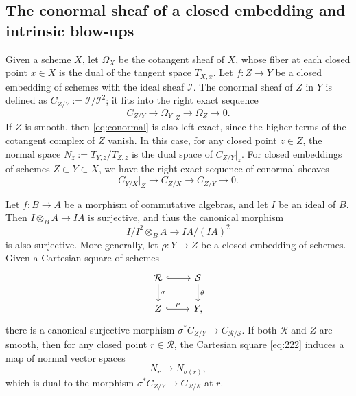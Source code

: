 \documentclass{amsart}
\numberwithin{equation}{section}
\newcommand\mc{\mathcal}
\theoremstyle{definition}
\theoremstyle{remark}
\begin{document}
\subsection{The conormal sheaf of a closed embedding and intrinsic blow-ups}
Given a scheme $X$, let $\Omega_X$ be the cotangent sheaf of $X$, whose fiber at each closed point $x\in X$ is the dual of the tangent space $T_{X,x}$. Let $f:Z\to Y$ be a closed embedding of schemes with the ideal sheaf $\mc{I}$. The conormal sheaf of $Z$ in $Y$ is defined as $C_{Z/Y}:=\mc{I}/\mc{I}^{2}$; it fits into the right exact sequence 
\begin{equation}
  \label{eq:conormal}
  C_{Z/Y}\to \Omega_{Y}|_{Z}\to \Omega_{Z}\to 0.
\end{equation}
If $Z$ is smooth, then \cref{eq:conormal} is also left exact, since the higher terms of the cotangent complex of $Z$ vanish. In this case, for any closed point $z\in Z$, the normal space $N_{z}:=T_{Y,z}/T_{Z,z}$ is the dual space of $C_{Z/Y}|_{z}$. For closed embeddings of schemes $Z\subset Y\subset X$, we have the right exact sequence of conormal sheaves
\begin{equation*}
  C_{Y/X}|_{Z}\to C_{Z/X}\to C_{Z/Y}\to 0.
\end{equation*}

Let $f:B\to A$ be a morphism of commutative algebras, and let $I$ be an ideal of $B$. Then $I\otimes_{B}A\to IA$ is surjective, and thus the canonical morphism 
\begin{equation*}
  I/I^{2}\otimes_BA\to IA/(IA)^{2}
\end{equation*}
is also surjective. More generally, let $\rho:Y\to Z$ be a closed embedding of schemes. Given a Cartesian square of schemes
  \begin{equation}
    \label{eq:222}
  \begin{tikzcd}
    \mc{R} \arrow[r, hook] \arrow[d,"\sigma"] & \mc{S} \arrow[d, "\theta"]\\
    Z \arrow[r, hook,"\rho"] & Y,
  \end{tikzcd}
\end{equation}
there is a canonical surjective morphism $\sigma^{*}C_{Z/Y}\to C_{\mc{R}/\mc{S}}$. If both $\mc{R}$ and $Z$ are smooth, then for any closed point $r\in \mc{R}$, the Cartesian square \cref{eq:222} induces a map of normal vector spaces 
\begin{equation*}
  N_{r}\to N_{\sigma(r)},
\end{equation*}
which is dual to the morphism $\sigma^{*}C_{Z/Y}\to C_{\mc{R}/\mc{S}}$ at $r$. 
\end{document}
